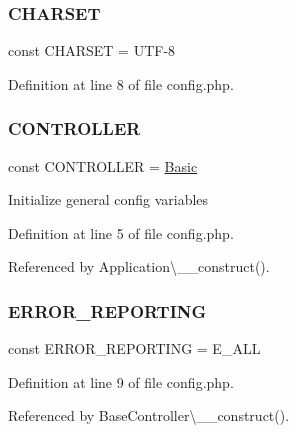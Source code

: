 \subsubsection{\texorpdfstring{C\+H\+A\+R\+S\+ET}{CHARSET}}
{\footnotesize\ttfamily const C\+H\+A\+R\+S\+ET = \textquotesingle{}U\+TF-\/8\textquotesingle{}}



Definition at line 8 of file config.\+php.

\hypertarget{config_8php_afa55a6839ec4ad32fc00879d78229356}{}\label{config_8php_afa55a6839ec4ad32fc00879d78229356} 
\subsubsection{\texorpdfstring{C\+O\+N\+T\+R\+O\+L\+L\+ER}{CONTROLLER}}
{\footnotesize\ttfamily const C\+O\+N\+T\+R\+O\+L\+L\+ER = \textquotesingle{}\hyperlink{class_basic}{Basic}\textquotesingle{}}

Initialize general config variables 

Definition at line 5 of file config.\+php.



Referenced by Application\textbackslash{}\+\_\+\+\_\+construct().

\hypertarget{config_8php_a80c2f40a4ce1ad3cbfb1978239f63c31}{}\label{config_8php_a80c2f40a4ce1ad3cbfb1978239f63c31} 
\subsubsection{\texorpdfstring{E\+R\+R\+O\+R\+\_\+\+R\+E\+P\+O\+R\+T\+I\+NG}{ERROR\_REPORTING}}
{\footnotesize\ttfamily const E\+R\+R\+O\+R\+\_\+\+R\+E\+P\+O\+R\+T\+I\+NG = E\+\_\+\+A\+LL}



Definition at line 9 of file config.\+php.



Referenced by Base\+Controller\textbackslash{}\+\_\+\+\_\+construct().

\hypertarget{config_8php_a2de069ac064bb137af53d99e3fcff3c8}{}\label{config_8php_a2de069ac064bb137af53d99e3fcff3c8} 
